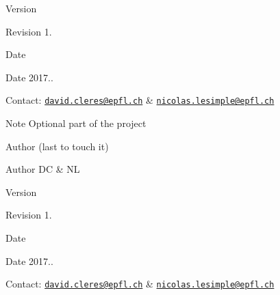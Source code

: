 \begin{DoxyVersion}{Version}

\end{DoxyVersion}
\begin{DoxyParagraph}{Revision}
1. 
\end{DoxyParagraph}


\begin{DoxyDate}{Date}

\end{DoxyDate}
\begin{DoxyParagraph}{Date}
2017.. 
\end{DoxyParagraph}


Contact\+: \href{mailto:david.cleres@epfl.ch}{\tt david.\+cleres@epfl.\+ch} \& \href{mailto:nicolas.lesimple@epfl.ch}{\tt nicolas.\+lesimple@epfl.\+ch}

\begin{DoxyNote}{Note}
Optional part of the project
\end{DoxyNote}
\begin{DoxyAuthor}{Author}
(last to touch it) 
\end{DoxyAuthor}
\begin{DoxyParagraph}{Author}
DC \& NL
\end{DoxyParagraph}


\begin{DoxyVersion}{Version}

\end{DoxyVersion}
\begin{DoxyParagraph}{Revision}
1. 
\end{DoxyParagraph}


\begin{DoxyDate}{Date}

\end{DoxyDate}
\begin{DoxyParagraph}{Date}
2017.. 
\end{DoxyParagraph}


Contact\+: \href{mailto:david.cleres@epfl.ch}{\tt david.\+cleres@epfl.\+ch} \& \href{mailto:nicolas.lesimple@epfl.ch}{\tt nicolas.\+lesimple@epfl.\+ch} 